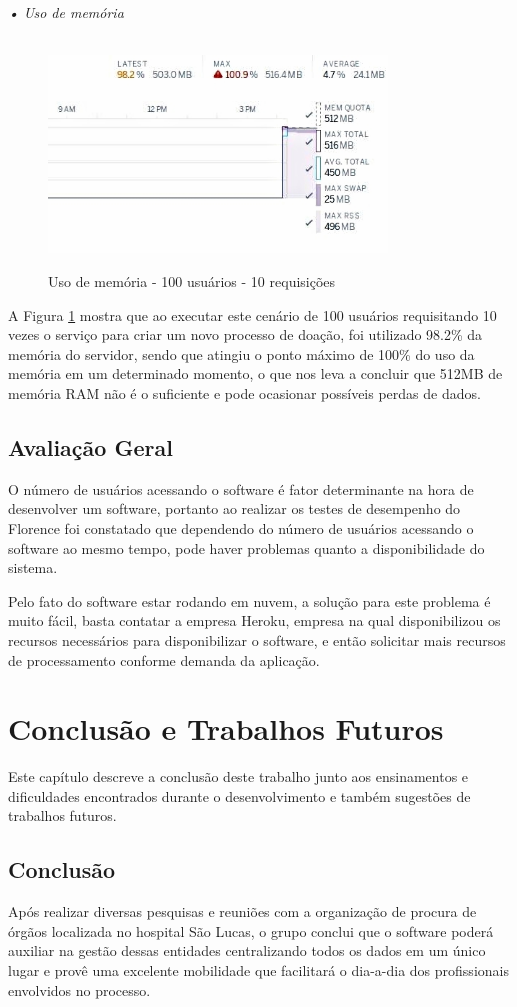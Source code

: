 \documentclass[portuguese,oneside]{tcc}
\begin{document}
\subparagraph{• Uso de memória}
\begin{figure}[htp]
\centering
\caption{Uso de memória - 100 usuários - 10 requisições}
\includegraphics[width=9cm]{100-10-memory}
\label{fig:uso-de-memoria-100-10}
\end{figure}
A Figura \ref{fig:uso-de-memoria-100-10} mostra que ao executar este cenário de 100 usuários requisitando 10 vezes o serviço para criar um novo processo de doação, foi utilizado 98.2\% da memória do servidor, sendo que atingiu o ponto máximo de 100\% do uso da memória em um determinado momento, o que nos leva a concluir que 512MB de memória RAM não é o suficiente e pode ocasionar possíveis perdas de dados.

\section{Avaliação Geral}
O número de usuários acessando o software é fator determinante na hora de desenvolver um software, portanto ao realizar os testes de desempenho do Florence foi constatado que dependendo do número de usuários acessando o software ao mesmo tempo, pode haver problemas quanto a disponibilidade do sistema.

Pelo fato do software estar rodando em nuvem, a solução para este problema é muito fácil, basta contatar a empresa Heroku, empresa na qual disponibilizou os recursos necessários para disponibilizar o software, e então solicitar mais recursos de processamento conforme demanda da aplicação.

\chapter{Conclusão e Trabalhos Futuros}
Este capítulo descreve a conclusão deste trabalho junto aos ensinamentos e dificuldades encontrados durante o desenvolvimento e também sugestões de trabalhos futuros.

\section{Conclusão}
Após realizar diversas pesquisas e reuniões com a organização de procura de órgãos localizada no hospital São Lucas, o grupo conclui que o software poderá auxiliar na gestão dessas entidades centralizando todos os dados em um  único lugar e provê uma excelente mobilidade que facilitará o dia-a-dia dos profissionais envolvidos no processo.
\end{document}
